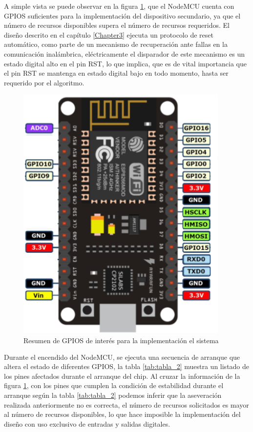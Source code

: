 A simple vista se puede observar en la figura \ref{fig:figura_e}, que el NodeMCU cuenta con GPIOS suficientes para la implementación del dispositivo secundario, ya que el número de recursos disponibles supera el número de recursos requeridos. El diseño descrito en el capítulo \ref{Chapter3} ejecuta un protocolo de reset automático, como parte de un mecanismo de  recuperación ante fallas en la comunicación inalámbrica, eléctricamente el disparador de este mecanismo es un estado digital alto en el pin RST, lo que implica, que es de vital importancia que el pin RST se mantenga en estado digital bajo en todo momento, hasta ser requerido por el algoritmo.

\begin{figure}[ht]
	\centering
	\includegraphics[scale=.55]{./Figures/Capitulo4/Figura_E.png}
	\caption{Resumen de GPIOS de interés para la implementación el sistema}
	\label{fig:figura_e}
\end{figure}

Durante el encendido del NodeMCU, se ejecuta una secuencia de arranque que altera el estado de diferentes GPIOS, la tabla \ref{tab:tabla_2} muestra un listado de los pines afectados durante el arranque del chip. Al cruzar la información de la figura \ref{fig:figura_e}, con los pines que cumplen la condición de estabilidad durante el arranque según la tabla \ref{tab:tabla_2} podemos inferir que la aseveración realizada anteriormente no es correcta, el número de recursos solicitados es mayor al número de recursos disponibles, lo que hace imposible la implementación del diseño con uso exclusivo de entradas y salidas digitales.

